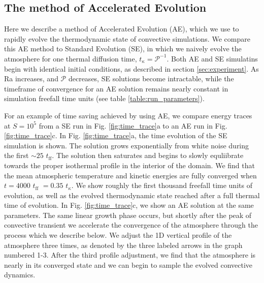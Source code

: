 \documentclass[aps, pre, onecolumn, nofootinbib, notitlepage, groupedaddress, amsfonts, amssymb, amsmath, longbibliography]{revtex4-1}
\begin{document}

\subsection{The method of Accelerated Evolution}
\label{subsection:ae}
Here we describe a method of Accelerated Evolution (AE), which we use 
to rapidly evolve the thermodynamic state of convective simulations.  
We compare this AE method to Standard Evolution
(SE), in which we naively evolve the atmosphere for one thermal diffusion time,
$t_\kappa = \mathcal{P}^{-1}$. Both AE and SE simulatins begin with identical
initial conditions, as described in section \ref{sec:experiment}.
As Ra increases, and $\mathcal{P}$ decreases, SE solutions become intractable, 
while the timeframe of convergence for an AE solution remains nearly constant
in simulation freefall time units (see table \ref{table:run_parameters}).

For an example of time saving achieved by using AE, we compare
energy traces at $S = 10^5$ from a SE run in Fig. \ref{fig:time_trace}a to an AE run
in Fig. \ref{fig:time_trace}c.
In Fig. \ref{fig:time_trace}a, the time evolution of the SE simulation is shown.
The solution grows exponentially from white noise during the
first $\sim 25$ $t_{\text{ff}}$. The solution then saturates and begins to slowly
equliibrate towards the proper isothermal profile in the interior of the domain.
We find that the mean atmospheric temperature and
kinetic energies are fully converged when $t = 4000$ $t_{\text{ff}}$ $= 0.35$ $t_{\kappa}$.
We show roughly the first thousand freefall time
units of evolution, as well as the evolved thermodynamic state reached after a full
thermal time of evolution.  In Fig. \ref{fig:time_trace}c, we show an AE solution
at the same parameters. The same linear growth phase occurs, but shortly after
the peak of convective transient we accelerate the convergence of the atmosphere
through the process which we describe below. We adjust the 1D vertical profile of
the atmosphere three times, as denoted by the three labeled
arrows in the graph numbered 1-3.  After the third profile adjustment, we find that
the atmosphere is nearly in its converged state and we can begin to sample the evolved
convective dynamics.
\end{document}
